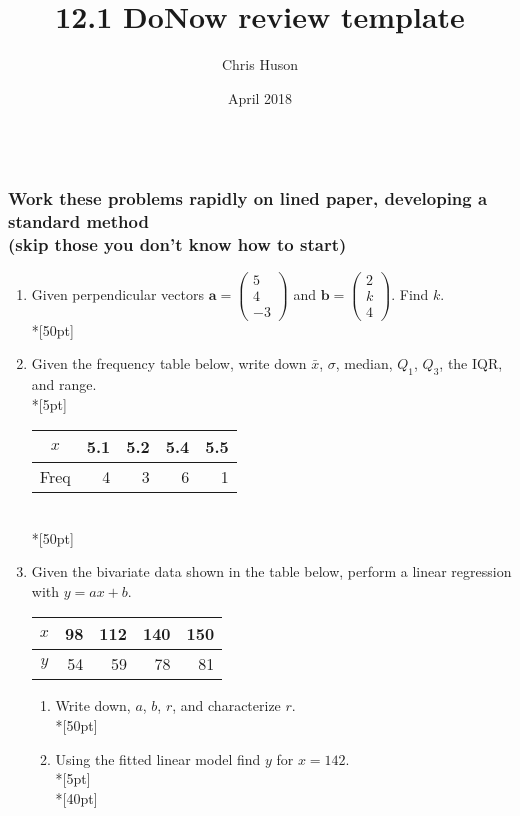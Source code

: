 \documentclass[12pt, oneside]{article}
\title{12.1 DoNow review template}
\author{Chris Huson}
\date{April 2018}
\begin{document}
\subsubsection*{\\ \textnormal{Work these problems rapidly on lined paper, developing a standard method \\(skip those you don't know how to start)}}

\begin{enumerate}
\item Given perpendicular vectors $\mathbf{a}= \begin{pmatrix} 5 \\ 4\\ -3 \end{pmatrix}$ and $\mathbf{b}= \begin{pmatrix} 2 \\ k \\ 4 \end{pmatrix}$. Find $k$.\\*[50pt]

\item Given the frequency table below, write down $\bar{x}$, $\sigma$, median, $Q_1$, $Q_3$, the IQR, and range.\\*[5pt]
\begin{tabular}{|c|r|r|r|r|}
\hline 
$x$ & 5.1 & 5.2 & 5.4 & 5.5\\ 
\hline 
Freq & 4 & 3 & 6 & 1  \\ 
\hline 
\end{tabular}\\*[50pt]

\item Given the bivariate data shown in the table below, perform a linear regression with $y=ax+b$.\\
\begin{tabular}{|c|r|r|r|r|}
\hline 
$x$ & 98 & 112 & 140 & 150\\ 
\hline 
$y$ & 54 & 59 & 78 & 81  \\ 
\hline 
\end{tabular}
\begin{enumerate}
    \item Write down, $a$, $b$, $r$, and characterize $r$.\\*[50pt]
\item Using the fitted linear model find $y$ for $x=142$.\\*[5pt]
\\*[40pt]
\end{enumerate}


\end{enumerate}
\end{document}
